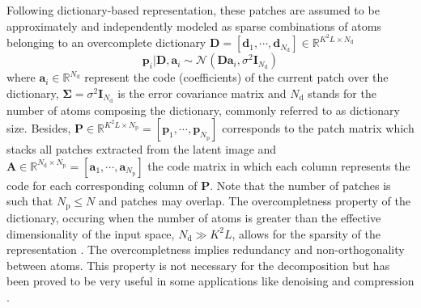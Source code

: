 \documentclass[review]{elsarticle}
\newcommand{\Ndim}{L}
\newcommand{\Psize}{K}
\newcommand{\Natom}{N_{\mathrm{d}}}
\newcommand{\Npatch}{N_{\mathrm{p}}}
\begin{document}
Following dictionary-based representation, these patches are assumed to be approximately and independently modeled as sparse combinations of atoms belonging to an overcomplete dictionary $\mathbf{D}  = \left[\mathbf{d}_{1}, \cdots, \mathbf{d}_{\Natom}\right] \in \mathbb{R}^{\Psize^{2}\Ndim \times \Natom}$
%
\begin{equation}
\label{eq:patchRepresentation}
	\mathbf{p}_{i}|\mathbf{D},\mathbf{a}_{i} \sim \mathcal{N}\left(\mathbf{D}\mathbf{a}_{i},\sigma^2 \mathbf{I}_{\Natom}\right)
\end{equation}
%
where $\mathbf{a}_{i} \in \mathbb{R}^{\Natom}$ represent the code (coefficients) of the current patch over the dictionary, $\boldsymbol{\Sigma}=\sigma^2 \mathbf{I}_{\Natom}$ is the error covariance matrix and $\Natom$ stands for the number of atoms composing the dictionary, commonly referred to as dictionary size. Besides, $\mathbf{P} \in \mathbb{R}^{\Psize^{2}\Ndim \times \Npatch} = \left[\mathbf{p}_{1}, \cdots, \mathbf{p}_{\Npatch}\right]$ corresponds to the patch matrix which stacks all patches extracted from the latent image and $\mathbf{A} \in \mathbb{R}^{\Natom \times \Npatch} = \left[\mathbf{a}_{1}, \cdots, \mathbf{a}_{\Npatch}\right]$ the code matrix in which each column represents the code for each corresponding column of $\mathbf{P}$. Note that the number of patches is such that $\Npatch \leq N$ and patches may overlap. The overcompletness property of the dictionary, occuring when the number of atoms is greater than the effective dimensionality of the input space, $\Natom \gg \Psize^{2} \Ndim $, allows for the sparsity of the representation \citep{olshausen_sparse_1997}. The overcompletness implies redundancy and non-orthogonality between atoms. This property is not necessary for the decomposition but has been proved to be very useful in some applications like denoising and compression \citep{aharon_k-svd_2006}.
\end{document}
